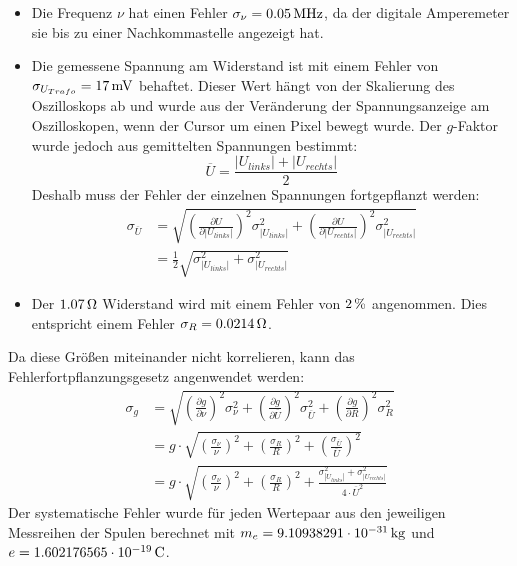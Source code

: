 \documentclass[a4paper,titlepage]{scrartcl}
\numberwithin{equation}{section}
\begin{document}
\begin{itemize}
\item Die Frequenz $\nu$ hat einen Fehler $\sigma_{\nu}=\unit[0.05]{MHz}$, da der digitale Amperemeter sie bis zu einer Nachkommastelle angezeigt hat.
\item Die gemessene Spannung am Widerstand ist mit einem Fehler von $\sigma_{U_{Trafo}}=\unit[17]{mV}$ behaftet. Dieser Wert hängt von der Skalierung des Oszilloskops ab und wurde aus der Veränderung der Spannungsanzeige am Oszilloskopen, wenn der Cursor um einen Pixel bewegt wurde. Der $g$-Faktor wurde jedoch aus gemittelten Spannungen bestimmt:
\begin{equation*}
\overline{U}=\frac{|U_{links}| + |U_{rechts}|}{2}
\end{equation*}
Deshalb muss der Fehler der einzelnen Spannungen fortgepflanzt werden:
\begin{align*}
\sigma_{\overline{U}}&=\sqrt{\left( \frac{\partial U}{\partial |U_{links}|} \right)^2 \sigma^2_{|U_{links}|} + \left( \frac{\partial U}{\partial |U_{rechts}|} \right)^2 \sigma^2_{|U_{rechts}|}}\\
&=\frac{1}{2} \sqrt{\sigma^2_{|U_{links}|} + \sigma^2_{|U_{rechts}|}}
\end{align*}
\item Der $\unit[1.07]{\Omega}$ Widerstand wird mit einem Fehler von $\unit[2]{\%}$ angenommen. Dies entspricht einem Fehler $\sigma_R=\unit[0.0214]{\Omega}$.
\end{itemize}
Da diese Größen miteinander nicht korrelieren, kann das Fehlerfortpflanzungsgesetz angenwendet werden:
\begin{align*}
\sigma_g&=\sqrt{\left( \frac{\partial g}{\partial \nu} \right)^2 \sigma^2_{\nu} + \left( \frac{\partial g}{\partial \overline{U}} \right)^2 \sigma^2_{\overline{U}} + \left( \frac{\partial g}{\partial R} \right)^2 \sigma^2_R}\\
&=g \cdot \sqrt{\left( \frac{\sigma_{\nu}}{\nu} \right)^2 + \left( \frac{\sigma_R}{R} \right)^2 + \left( \frac{\sigma_{\overline{U}}}{\overline{U}} \right)^2}\\
&=g \cdot \sqrt{\left( \frac{\sigma_{\nu}}{\nu} \right)^2 + \left( \frac{\sigma_R}{R} \right)^2 + \frac{\sigma^2_{|U_{links}|} + \sigma^2_{|U_{rechts}|}}{4 \cdot \overline{U}^2}}
\end{align*}
Der systematische Fehler wurde für jeden Wertepaar aus den jeweiligen Messreihen der Spulen berechnet mit $m_e=\unit[9.10938291 \cdot 10^{-31}]{kg}$ und $e=\unit[1.602176565 \cdot 10^{-19}]{C}$.
\end{document}
